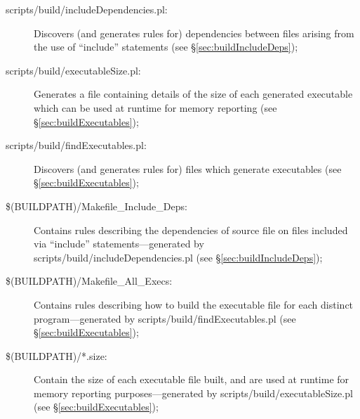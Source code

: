 \begin{description}
\item[{\normalfont \ttfamily scripts/build/includeDependencies.pl}:] Discovers (and generates rules for) dependencies between files arising from the use of ``{\normalfont \ttfamily include}'' statements (see \S\ref{sec:buildIncludeDeps});
  
  \item[{\normalfont \ttfamily \normalfont \ttfamily scripts/build/executableSize.pl}:] Generates a file containing details of the size of each generated executable which can be used at runtime for memory reporting (see \S\ref{sec:buildExecutables});

\item[{\normalfont \ttfamily \normalfont \ttfamily scripts/build/findExecutables.pl}:] Discovers (and generates rules for) files which generate executables (see \S\ref{sec:buildExecutables});

\item[{\normalfont \ttfamily \$(BUILDPATH)/Makefile\_Include\_Deps}:] Contains rules describing the dependencies of source file on files included via ``{\normalfont \ttfamily include}'' statements---generated by {\normalfont \ttfamily scripts/build/includeDependencies.pl} (see \S\ref{sec:buildIncludeDeps});

\item[{\normalfont \ttfamily \$(BUILDPATH)/Makefile\_All\_Execs}:] Contains rules describing how to build the executable file for each distinct program---generated by {\normalfont \ttfamily scripts/build/findExecutables.pl} (see \S\ref{sec:buildExecutables});

\item[{\normalfont \ttfamily \$(BUILDPATH)/*.size}:] Contain the size of each executable file built, and are used at runtime for memory reporting purposes---generated by {\normalfont \ttfamily scripts/build/executableSize.pl} (see \S\ref{sec:buildExecutables});
\end{description}

